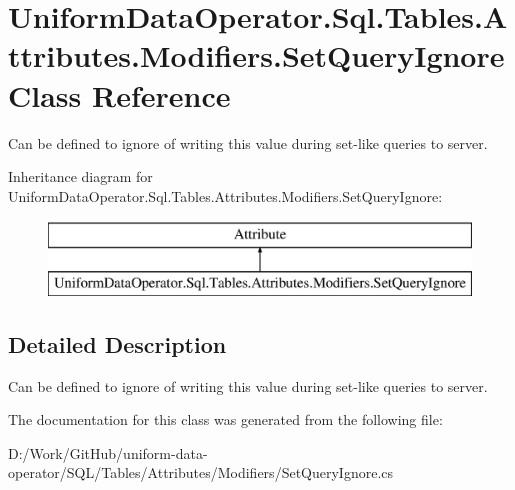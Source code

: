 \hypertarget{class_uniform_data_operator_1_1_sql_1_1_tables_1_1_attributes_1_1_modifiers_1_1_set_query_ignore}{}\section{Uniform\+Data\+Operator.\+Sql.\+Tables.\+Attributes.\+Modifiers.\+Set\+Query\+Ignore Class Reference}
\label{class_uniform_data_operator_1_1_sql_1_1_tables_1_1_attributes_1_1_modifiers_1_1_set_query_ignore}


Can be defined to ignore of writing this value during set-\/like queries to server.  


Inheritance diagram for Uniform\+Data\+Operator.\+Sql.\+Tables.\+Attributes.\+Modifiers.\+Set\+Query\+Ignore\+:\begin{figure}[H]
\begin{center}
\leavevmode
\includegraphics[height=2.000000cm]{d2/d13/class_uniform_data_operator_1_1_sql_1_1_tables_1_1_attributes_1_1_modifiers_1_1_set_query_ignore}
\end{center}
\end{figure}


\subsection{Detailed Description}
Can be defined to ignore of writing this value during set-\/like queries to server. 



The documentation for this class was generated from the following file\+:\begin{DoxyCompactItemize}
\item 
D\+:/\+Work/\+Git\+Hub/uniform-\/data-\/operator/\+S\+Q\+L/\+Tables/\+Attributes/\+Modifiers/Set\+Query\+Ignore.\+cs\end{DoxyCompactItemize}
